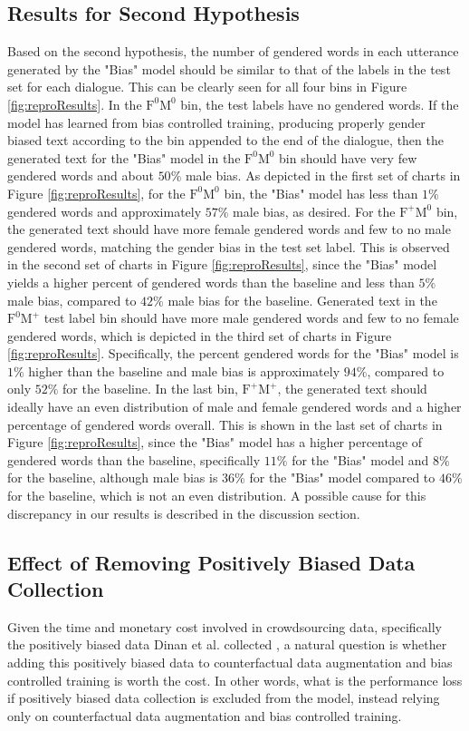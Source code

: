 \subsection{Results for Second Hypothesis}
Based on the second hypothesis, the number of gendered words in each utterance generated by the "Bias" model should be similar to that of the labels in the test set for each dialogue. This can be clearly seen for all four bins in Figure \ref{fig:reproResults}. In the $\mathrm{F}^0\mathrm{M}^0$ bin, the test labels have no gendered words. If the model has learned from bias controlled training, producing properly gender biased text according to the bin appended to the end of the dialogue, then the generated text for the "Bias" model in the $\mathrm{F}^0\mathrm{M}^0$ bin should have very few gendered words and about $50\%$ male bias. As depicted in the first set of charts in Figure \ref{fig:reproResults}, for the $\mathrm{F}^0\mathrm{M}^0$ bin, the "Bias" model has less than $1\%$ gendered words and approximately $57\%$ male bias, as desired. For the $\mathrm{F}^+\mathrm{M}^0$ bin, the generated text should have more female gendered words and few to no male gendered words, matching the gender bias in the test set label. This is observed in the second set of charts in Figure \ref{fig:reproResults}, since the "Bias" model yields a higher percent of gendered words than the baseline and less than $5\%$ male bias, compared to $42\%$ male bias for the baseline. Generated text in the $\mathrm{F}^0\mathrm{M}^+$ test label bin should have more male gendered words and few to no female gendered words, which is depicted in the third set of charts in Figure \ref{fig:reproResults}. Specifically, the percent gendered words for the "Bias" model is $1\%$ higher than the baseline and male bias is approximately $94\%$, compared to only $52\%$ for the baseline. In the last bin, $\mathrm{F}^+\mathrm{M}^+$, the generated text should ideally have an even distribution of male and female gendered words and a higher percentage of gendered words overall. This is shown in the last set of charts in Figure \ref{fig:reproResults}, since the "Bias" model has a higher percentage of gendered words than the baseline, specifically $11\%$ for the "Bias" model and $8\%$ for the baseline, although male bias is $36\%$ for the "Bias" model compared to $46\%$ for the baseline, which is not an even distribution. A possible cause for this discrepancy in our results is described in the discussion section.

\subsection{Effect of Removing Positively Biased Data Collection}
Given the time and monetary cost involved in crowdsourcing data, specifically the positively biased data Dinan et al. collected \supercite{dinan2020}, a natural question is whether adding this positively biased data to counterfactual data augmentation and bias controlled training is worth the cost. In other words, what is the performance loss if positively biased data collection is excluded from the model, instead relying only on counterfactual data augmentation and bias controlled training.

